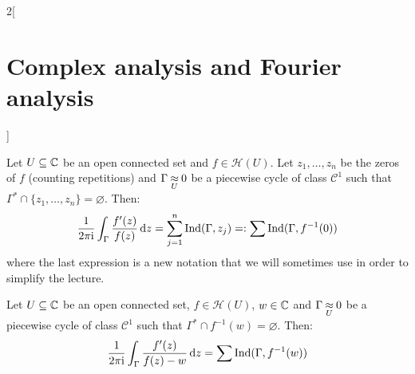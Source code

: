 \documentclass[../../../main.tex]{subfiles}
\begin{document}
\begin{multicols}{2}[\section{Complex analysis and Fourier analysis}]
  \begin{theorem}
    Let $U\subseteq\mathbb{C}$ be an open connected set and $f\in\mathcal{H}(U)$. Let $z_1,\ldots,z_n$ be the zeros of $f$ (counting repetitions) and $\Gamma\mathbin{\underset{U}{\approx}} 0$ be a piecewise cycle of class $\mathcal{C}^1$ such that $\Gamma^*\cap\{z_1,\ldots,z_n\}=\varnothing$. Then:
    $$\frac{1}{2\pi\mathrm{i}}\int_{\Gamma}\frac{f'(z)}{f(z)}\dd{z}=\sum_{j=1}^n\operatorname{Ind}(\Gamma,z_j)=:\sum\operatorname{Ind}(\Gamma,f^{-1}(0))$$
    where the last expression is a new notation that we will sometimes use in order to simplify the lecture.
  \end{theorem}
  \begin{corollary}
    Let $U\subseteq\mathbb{C}$ be an open connected set, $f\in\mathcal{H}(U)$, $w\in \mathbb{C}$ and $\Gamma\mathbin{\underset{U}{\approx}} 0$ be a piecewise cycle of class $\mathcal{C}^1$ such that $\Gamma^*\cap f^{-1}(w)=\varnothing$. Then:
    $$\frac{1}{2\pi\mathrm{i}}\int_{\Gamma}\frac{f'(z)}{f(z)-w}\dd{z}=\sum\operatorname{Ind}(\Gamma,f^{-1}(w))$$
  \end{corollary}

\end{multicols}
\end{document}
